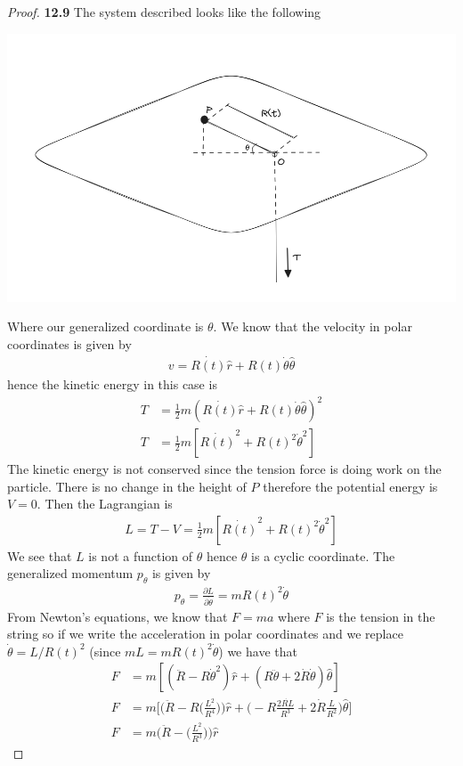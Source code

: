 \documentclass[11pt]{article}
\theoremstyle{definition}
\begin{document}
\begin{proof}{\textbf{12.9}}
    The system described looks like the following
    \begin{center}
        \includegraphics[scale=0.4]{ch12-9.png}
    \end{center}
    Where our generalized coordinate is $\theta$. We know that the velocity in
    polar coordinates is given by
    \begin{align*}
        v = \dot{R(t)} \hat{r} + R(t) \dot\theta \hat{\theta}
    \end{align*}
    hence the kinetic energy in this case is
    \begin{align*}
        T &= \frac{1}{2}m (\dot{R(t)} \hat{r} + R(t) \dot\theta \hat{\theta})^2\\
        T &= \frac{1}{2}m [\dot{R(t)}^2 + R(t)^2 \dot\theta^2]
    \end{align*}
    The kinetic energy is not conserved since the tension force is doing work
    on the particle.
    There is no change in the height of $P$ therefore the potential energy is
    $V = 0$. Then the Lagrangian is
    \begin{align*}
        L = T - V = \frac{1}{2}m [\dot{R(t)}^2 + R(t)^2 \dot\theta^2]
    \end{align*}
    We see that $L$ is not a function of $\theta$ hence $\theta$ is a cyclic
    coordinate. The generalized momentum $p_\theta$ is given by
    \begin{align*}
        p_\theta = \frac{\partial L}{\partial \dot\theta} 
        = m R(t)^2 \dot\theta
    \end{align*}
    From Newton's equations, we know that $F = ma$ where $F$ is the tension 
    in the string so if we write the acceleration in polar coordinates
    and we replace $\dot\theta = L/R(t)^2$ (since $mL = mR(t)^2\dot\theta$)
    we have that
    \begin{align*}
        F &= m[(\ddot{R} - R\dot{\theta}^2)\hat{r}
        + (R\ddot\theta + 2\dot{R}\dot\theta)\hat{\theta}]\\
        F &= m\bigg[\bigg(\ddot{R}
        - R\bigg(\frac{L^2}{R^4}\bigg)\bigg)\hat{r}
        + \bigg(-R\frac{2\dot{RL}}{R^3} + 2\dot{R}\frac{L}{R^2}\bigg)
        \hat{\theta}\bigg]\\
        F &= m\bigg(\ddot{R} 
        - \bigg(\frac{L^2}{R^3}\bigg)\bigg)\hat{r}
    \end{align*}

\end{proof}
\end{document}
